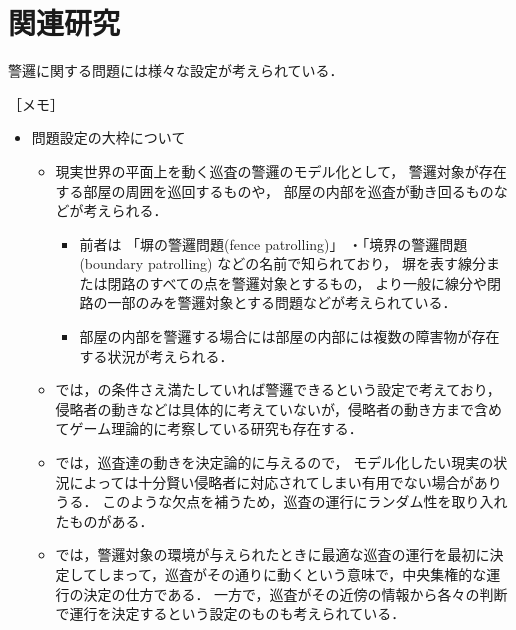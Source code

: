 \section{関連研究}
\label{section: relatedWorks}

警邏に関する問題には様々な設定が考えられている．

［メモ］
\begin{itemize}

  \item 問題設定の大枠について
  \begin{itemize}
    \item 現実世界の平面上を動く巡査の警邏のモデル化として，
      警邏対象が存在する部屋の周囲を巡回するものや，
      部屋の内部を巡査が動き回るものなどが考えられる．
    \begin{itemize}
      \item 
        前者は
        「塀の警邏問題(fence patrolling)」
        ・「境界の警邏問題(boundary patrolling)
        などの名前で知られており，
        塀を表す線分または閉路のすべての点を警邏対象とするもの\cite{czyzowicz2011boundary, dumitrescu2014fence, kawamura2015fence}，
        より一般に線分や閉路の一部のみを警邏対象とする問題などが考えられている\cite{collins2013optimal}．
      \item 
        部屋の内部を警邏する場合には部屋の内部には複数の障害物が存在する状況が考えられる\cite{}．
        
    \end{itemize}
    \item {\patProb}では，{\maxIdletime}の条件さえ満たしていれば警邏できるという設定で考えており，侵略者の動きなどは具体的に考えていないが，侵略者の動き方まで含めてゲーム理論的に考察している研究も存在する\cite{brazdil2015strategy, papadaki2016patrolling}．
    \item {\patProb}では，巡査達の動きを決定論的に与えるので，
    モデル化したい現実の状況によっては十分賢い侵略者に対応されてしまい有用でない場合がありうる．
    このような欠点を補うため，巡査の運行にランダム性を取り入れたものがある\cite{}．
    \item {\patProb}では，警邏対象の環境が与えられたときに最適な巡査の運行を最初に決定してしまって，巡査がその通りに動くという意味で，中央集権的な運行の決定の仕方である．
    一方で，巡査がその近傍の情報から各々の判断で運行を決定するという設定のものも考えられている\cite{}．
  \end{itemize}


\end{itemize}
